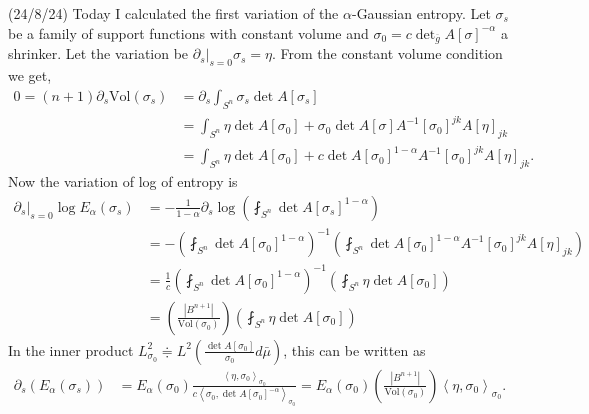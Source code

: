\documentclass[12pt,a4paper]{article}
\begin{document}
(24/8/24) Today I calculated the first variation of the $ \alpha $-Gaussian entropy. Let $ \sigma_{s} $ be a family of support functions with constant volume and $ \sigma_{0} = c\det_{\overline{g}}A[\sigma]^{-\alpha} $ a shrinker. Let the variation be $ \partial_{s}|_{s=0}\sigma_{s} = \eta $. From the constant volume condition we get, \begin{align*}
0 = (n+1)\partial_{s}\text{Vol}(\sigma_{s}) & = \partial_{s} 
\int_{S^{n}} \sigma_{s}\det A[\sigma_{s}] \\
& = \int_{S^{n}} \eta \det A[\sigma_{0}] + \sigma_{0}\det A[\sigma]A^{-1}[\sigma_{0}]^{jk}A[\eta]_{jk} \\
& = \int_{S^{n}} \eta \det A[\sigma_{0}] + c\det A[\sigma_{0}]^{1-\alpha}A^{-1}[\sigma_{0}]^{jk}A[\eta]_{jk}.
\end{align*}
Now the variation of log of entropy is 
\begin{align*}
   \partial_{s}\big|_{s=0}\log E_{\alpha}(\sigma_{s}) & = - \frac{1}{1-\alpha}\partial_{s}\log \left( \fint_{S^{n}} \det A[\sigma_{s}]^{1-\alpha} \right) \\
   & = - \left( \fint_{S^{n}} \det A[\sigma_{0}]^{1-\alpha} \right)^{-1} \left( \fint_{S^{n}} \det A[\sigma_{0}]^{1-\alpha} A^{-1}[\sigma_{0}]^{jk}A[\eta]_{jk}  \right) \\
   & = \frac{1}{c} \left( \fint_{S^{n}} \det A[\sigma_{0}]^{1-\alpha} \right)^{-1} \left(\fint_{S^{n}} \eta \det A[\sigma_{0}] \right) \\
   & = \left( \frac{|B^{n+1}|}{\text{Vol}(\sigma_{0})} \right) \left(\fint_{S^{n}} \eta \det A[\sigma_{0}] \right)
\end{align*}
In the inner product $ L^{2}_{\sigma_{0}} \doteqdot L^{2}\left( \frac{\det A[\sigma_{0}]}{\sigma_{0}}d \bar{\mu}\right) $, this can be written as 
\begin{align*}
   \partial_{s}(E_{\alpha}(\sigma_{s})) & = E_{\alpha}(\sigma_{0}) \frac{ \left< \eta, \sigma_{0} \right>_{\sigma_{0}}}{c \left< \sigma_{0}, \det A[\sigma_{0}]^{-\alpha} \right>_{\sigma_{0}}} = E_{\alpha}(\sigma_{0}) \left( \frac{|B^{n+1}|}{\text{Vol}(\sigma_{0})} \right)\left< \eta, \sigma_{0} \right>_{\sigma_{0}}. \\
\end{align*}
\end{document}

